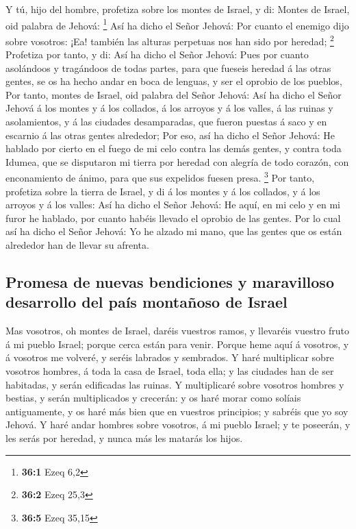  Y tú, hijo del hombre, profetiza sobre los montes de
Israel, y di: Montes de Israel, oid palabra de Jehová: \footnote{\textbf{36:1}
  Ezeq 6,2}  Así ha dicho el Señor Jehová: Por cuanto el
enemigo dijo sobre vosotros: ¡Ea! también las alturas perpetuas nos han
sido por heredad; \footnote{\textbf{36:2} Ezeq 25,3} 
Profetiza por tanto, y di: Así ha dicho el Señor Jehová: Pues por cuanto
asolándoos y tragándoos de todas partes, para que fueseis heredad á las
otras gentes, se os ha hecho andar en boca de lenguas, y ser el oprobio
de los pueblos,  Por tanto, montes de Israel, oid palabra
del Señor Jehová: Así ha dicho el Señor Jehová á los montes y á los
collados, á los arroyos y á los valles, á las ruinas y asolamientos, y á
las ciudades desamparadas, que fueron puestas á saco y en escarnio á las
otras gentes alrededor;  Por eso, así ha dicho el Señor
Jehová: He hablado por cierto en el fuego de mi celo contra las demás
gentes, y contra toda Idumea, que se disputaron mi tierra por heredad
con alegría de todo corazón, con enconamiento de ánimo, para que sus
expelidos fuesen presa. \footnote{\textbf{36:5} Ezeq 35,15}
 Por tanto, profetiza sobre la tierra de Israel, y di á
los montes y á los collados, y á los arroyos y á los valles: Así ha
dicho el Señor Jehová: He aquí, en mi celo y en mi furor he hablado, por
cuanto habéis llevado el oprobio de las gentes.  Por lo
cual así ha dicho el Señor Jehová: Yo he alzado mi mano, que las gentes
que os están alrededor han de llevar su afrenta.

\hypertarget{promesa-de-nuevas-bendiciones-y-maravilloso-desarrollo-del-pauxeds-montauxf1oso-de-israel}{%
\subsection{Promesa de nuevas bendiciones y maravilloso desarrollo del
país montañoso de
Israel}\label{promesa-de-nuevas-bendiciones-y-maravilloso-desarrollo-del-pauxeds-montauxf1oso-de-israel}}

 Mas vosotros, oh montes de Israel, daréis vuestros ramos,
y llevaréis vuestro fruto á mi pueblo Israel; porque cerca están para
venir.  Porque heme aquí á vosotros, y á vosotros me
volveré, y seréis labrados y sembrados.  Y haré
multiplicar sobre vosotros hombres, á toda la casa de Israel, toda ella;
y las ciudades han de ser habitadas, y serán edificadas las ruinas.
 Y multiplicaré sobre vosotros hombres y bestias, y serán
multiplicados y crecerán: y os haré morar como solíais antiguamente, y
os haré más bien que en vuestros principios; y sabréis que yo soy
Jehová.  Y haré andar hombres sobre vosotros, á mi pueblo
Israel; y te poseerán, y les serás por heredad, y nunca más les matarás
los hijos.


